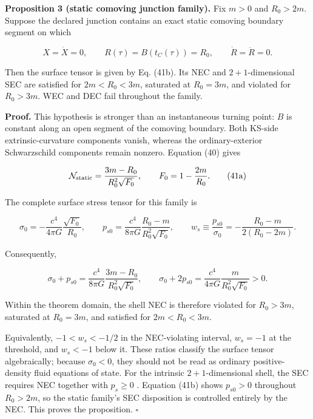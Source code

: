 \documentclass[pdflatex,sn-mathphys-num]{sn-jnl}
\begin{document}
\textbf{Proposition 3 (static comoving junction family).} Fix \(m>0\) and \(R_0>2m\). Suppose the declared junction contains an exact static comoving boundary segment on which


\[
X=\dot X=0,
\qquad
R(\tau)=B(t_C(\tau))=R_0,
\qquad
\dot R=\ddot R=0.
\]

Then the surface tensor is given by Eq. (41b). Its NEC and \(2+1\)-dimensional SEC are satisfied for \(2m<R_0<3m\), saturated at \(R_0=3m\), and violated for \(R_0>3m\). WEC and DEC fail throughout the family.


\textbf{Proof.} This hypothesis is stronger than an instantaneous turning point: \(B\) is constant along an open segment of the comoving boundary. Both KS-side extrinsic-curvature components vanish, whereas the ordinary-exterior Schwarzschild components remain nonzero. Equation (40) gives


\begin{equation}
\mathcal N_{\rm static}
=\frac{3m-R_0}{R_0^2\sqrt{F_0}},
\qquad
F_0=1-\frac{2m}{R_0}.
\tag{41a}
\end{equation}

The complete surface stress tensor for this family is


\begin{equation}
\sigma_0
=-\frac{c^4}{4\pi G}\frac{\sqrt{F_0}}{R_0},
\qquad
p_{s0}
=\frac{c^4}{8\pi G}
\frac{R_0-m}{R_0^2\sqrt{F_0}},
\qquad
w_s\equiv\frac{p_{s0}}{\sigma_0}
=-\frac{R_0-m}{2(R_0-2m)}.
\tag{41b}
\end{equation}

Consequently,


\begin{equation}
\sigma_0+p_{s0}
=\frac{c^4}{8\pi G}
\frac{3m-R_0}{R_0^2\sqrt{F_0}},
\qquad
\sigma_0+2p_{s0}
=\frac{c^4}{4\pi G}
\frac{m}{R_0^2\sqrt{F_0}}>0.
\tag{41c}
\end{equation}

Within the theorem domain, the shell NEC is therefore violated for \(R_0>3m\), saturated at \(R_0=3m\), and satisfied for \(2m<R_0<3m\).


Equivalently, \(-1<w_s<-1/2\) in the NEC-violating interval, \(w_s=-1\) at the threshold, and \(w_s<-1\) below it. These ratios classify the surface tensor algebraically; because \(\sigma_0<0\), they should not be read as ordinary positive-density fluid equations of state. For the intrinsic \(2+1\)-dimensional shell, the SEC requires NEC together with \(p_s\ge0\) \cite{ref20}. Equation (41b) shows \(p_{s0}>0\) throughout \(R_0>2m\), so the static family's SEC disposition is controlled entirely by the NEC. This proves the proposition. \(\square\)
\end{document}
